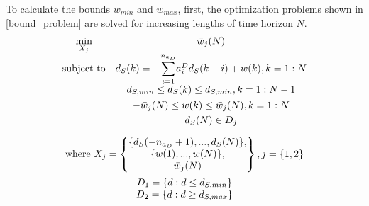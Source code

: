 \documentclass[letterpaper, 10 pt, conference]{ieeeconf}  %
\begin{document}
\begin{enumerate}
	To calculate the bounds $w_{min}$ and $w_{max}$, first, the optimization problems shown in \eqref{bound_problem} are solved for increasing lengths of time horizon $N$.
	\begin{equation}
	\begin{matrix}
	\begin{matrix}
	\underset{X_{j}}{\text{min}}
	& \bar{w}_j(N) \\
	\text{subject to}
	& 
	d_S(k) = -\mathlarger{\sum\limits_{i=1}^{n_{a_D}}}a_i^Dd_S(k-i) + w(k), k={1:N}\\
	& d_{S,min} \leq d_S(k) \leq d_{S,min}, k={1:N-1} \vspace{4pt}\\
	& -\bar{w}_j(N) \leq w(k) \leq \bar{w}_j(N), k={1:N} \vspace{3pt}\\
	& d_S(N) \in D_j 
	\end{matrix}
	\vspace{10pt} \\
	\text{where } X_j = 
	\begin{Bmatrix}
	\{d_S(-n_{a_D}+1),...,d_S(N)\},\\
	\{w(1),...,w(N)\},\vspace{0.001cm}\\
	\bar{w}_j(N)
	\end{Bmatrix}, j=\{1,2\}
	\vspace{5pt}\\
	\begin{matrix}
	D_1 = \{d:d \leq d_{S,min}\}\\
	D_2 = \{d:d \geq d_{S,max}\}
	\end{matrix}
	\end{matrix}
	\label{bound_problem}
	\end{equation}
	

\end{enumerate}
\end{document}
